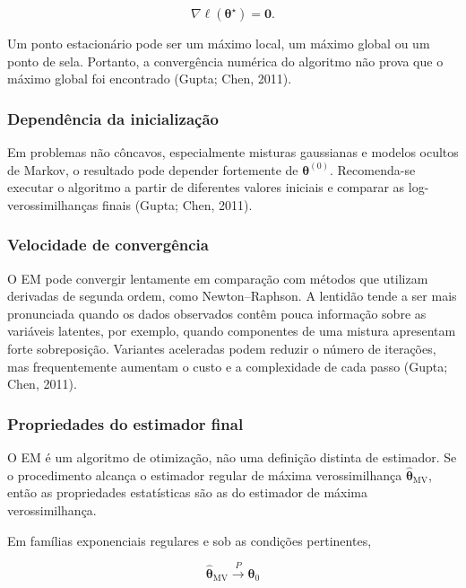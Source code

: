 \documentclass[
  letterpaper,
  DIV=11,
  numbers=noendperiod]{scrreprt}
\begin{document}
\[\nabla\ell(\boldsymbol{\theta}^\star)
=
\boldsymbol{0}.\]

Um ponto estacionário pode ser um máximo local, um máximo global ou um
ponto de sela. Portanto, a convergência numérica do algoritmo não prova
que o máximo global foi encontrado (Gupta; Chen, 2011).

\subsubsection{Dependência da
inicialização}\label{dependuxeancia-da-inicializauxe7uxe3o}

Em problemas não côncavos, especialmente misturas gaussianas e modelos
ocultos de Markov, o resultado pode depender fortemente de
\(\boldsymbol{\theta}^{(0)}\). Recomenda-se executar o algoritmo a
partir de diferentes valores iniciais e comparar as log-verossimilhanças
finais (Gupta; Chen, 2011).

\subsubsection{Velocidade de
convergência}\label{velocidade-de-converguxeancia}

O EM pode convergir lentamente em comparação com métodos que utilizam
derivadas de segunda ordem, como Newton--Raphson. A lentidão tende a ser
mais pronunciada quando os dados observados contêm pouca informação
sobre as variáveis latentes, por exemplo, quando componentes de uma
mistura apresentam forte sobreposição. Variantes aceleradas podem
reduzir o número de iterações, mas frequentemente aumentam o custo e a
complexidade de cada passo (Gupta; Chen, 2011).

\subsubsection{Propriedades do estimador
final}\label{propriedades-do-estimador-final}

O EM é um algoritmo de otimização, não uma definição distinta de
estimador. Se o procedimento alcança o estimador regular de máxima
verossimilhança \(\widehat{\boldsymbol{\theta}}_{\mathrm{MV}}\), então
as propriedades estatísticas são as do estimador de máxima
verossimilhança.

Em famílias exponenciais regulares e sob as condições pertinentes,

\[\widehat{\boldsymbol{\theta}}_{\mathrm{MV}}
\xrightarrow{P}
\boldsymbol{\theta}_0\]
\end{document}
